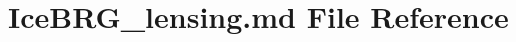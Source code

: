 \hypertarget{IceBRG__lensing_8md}{}\section{Ice\+B\+R\+G\+\_\+lensing.\+md File Reference}
\label{IceBRG__lensing_8md}
